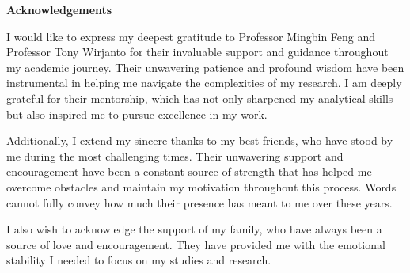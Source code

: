 \cleardoublepage


\begin{center}\textbf{Acknowledgements}\end{center}

I would like to express my deepest gratitude to Professor Mingbin Feng and Professor Tony Wirjanto for their invaluable support and guidance throughout my academic journey. 
Their unwavering patience and profound wisdom have been instrumental in helping me navigate the complexities of my research. 
I am deeply grateful for their mentorship, which has not only sharpened my analytical skills but also inspired me to pursue excellence in my work.

Additionally, I extend my sincere thanks to my best friends, who have stood by me during the most challenging times. 
Their unwavering support and encouragement have been a constant source of strength that has helped me overcome obstacles and maintain my motivation throughout this process. 
Words cannot fully convey how much their presence has meant to me over these years.

I also wish to acknowledge the support of my family, who have always been a source of love and encouragement.
They have provided me with the emotional stability I needed to focus on my studies and research.

\cleardoublepage

\renewcommand\contentsname{Table of Contents}
\tableofcontents
\cleardoublepage
{}    %

\listoftables
\cleardoublepage
{}		%

\listoffigures
\cleardoublepage
{}		%

\printglossaries
\cleardoublepage
{}		%


